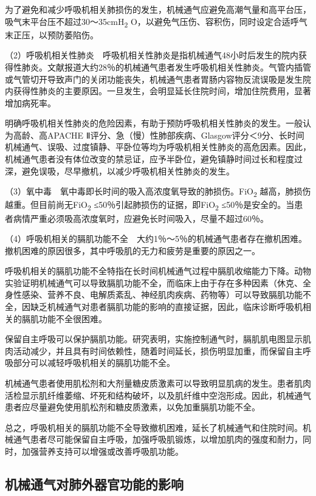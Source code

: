为了避免和减少呼吸机相关肺损伤的发生，机械通气应避免高潮气量和高平台压，吸气末平台压不超过30～35cmH\textsubscript{2}
O，以避免气压伤、容积伤，同时设定合适呼气末正压，以预防萎陷伤。

（2）呼吸机相关性肺炎　呼吸机相关性肺炎是指机械通气48小时后发生的院内获得性肺炎。文献报道大约28％的机械通气患者发生呼吸机相关性肺炎。气管内插管或气管切开导致声门的关闭功能丧失，机械通气患者胃肠内容物反流误吸是发生院内获得性肺炎的主要原因。一旦发生，会明显延长住院时间，增加住院费用，显著增加病死率。

明确呼吸机相关性肺炎的危险因素，有助于预防呼吸机相关性肺炎的发生。一般认为高龄、高APACHE
Ⅱ评分、急（慢）性肺部疾病、Glasgow评分＜9分、长时间机械通气、误吸、过度镇静、平卧位等均为呼吸机相关性肺炎的高危因素。因此，机械通气患者没有体位改变的禁忌证，应予半卧位，避免镇静时间过长和程度过深，避免误吸，尽早撤机，以减少呼吸机相关性肺炎的发生。

（3）氧中毒　氧中毒即长时间的吸入高浓度氧导致的肺损伤。FiO\textsubscript{2}
越高，肺损伤越重。但目前尚无FiO\textsubscript{2}
≤50％引起肺损伤的证据，即FiO\textsubscript{2}
≤50％是安全的。当患者病情严重必须吸高浓度氧时，应避免长时间吸入，尽量不超过60％。

（4）呼吸机相关的膈肌功能不全　大约1％～5％的机械通气患者存在撤机困难。撤机困难的原因很多，其中呼吸肌的无力和疲劳是重要的原因之一。

呼吸机相关的膈肌功能不全特指在长时间机械通气过程中膈肌收缩能力下降。动物实验证明机械通气可以导致膈肌功能不全，而临床上由于存在多种因素（休克、全身性感染、营养不良、电解质紊乱、神经肌肉疾病、药物等）可以导致膈肌功能不全，因缺乏机械通气对患者膈肌功能的影响的直接证据，因此，临床诊断呼吸机相关的膈肌功能不全很困难。

保留自主呼吸可以保护膈肌功能。研究表明，实施控制通气时，膈肌肌电图显示肌肉活动减少，并且具有时间依赖性，随着时间延长，损伤明显加重，而保留自主呼吸部分可以减轻呼吸机相关的膈肌功能不全。

机械通气患者使用肌松剂和大剂量糖皮质激素可以导致明显肌病的发生。患者肌肉活检显示肌纤维萎缩、坏死和结构破坏，以及肌纤维中空泡形成。因此，机械通气患者应尽量避免使用肌松剂和糖皮质激素，以免加重膈肌功能不全。

总之，呼吸机相关的膈肌功能不全导致撤机困难，延长了机械通气和住院时间。机械通气患者尽可能保留自主呼吸，加强呼吸肌锻炼，以增加肌肉的强度和耐力，同时，加强营养支持可以增强或改善呼吸肌功能。

\subsection{机械通气对肺外器官功能的影响}

